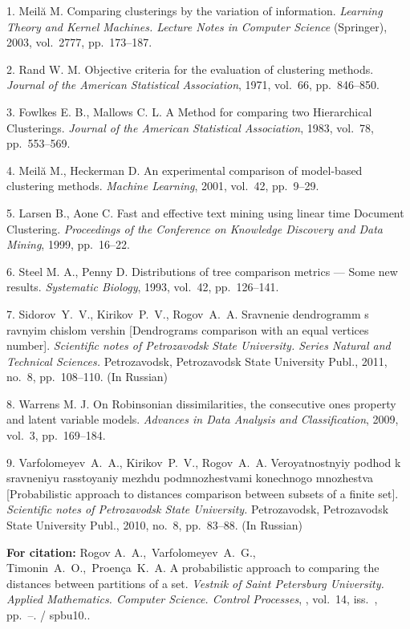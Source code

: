 

{\footnotesize

\vskip 2mm


\vskip 1.5mm

1. Meil\u{a} M. Comparing clusterings by the variation of
information. {\it Learning Theory and Kernel Machines. Lecture
Notes in Computer Science} (Springer), 2003, vol.~2777,
pp.~173--187.

2. Rand W. M. Objective criteria for the evaluation of clustering
methods. {\it Journal of the American Statistical Association},
1971, vol.~66, pp.~846--850.

3. Fowlkes E. B., Mallows C. L. A Method for comparing two
Hierarchical Clusterings. {\it Journal of the American Statistical
Association}, 1983, vol.~78, pp.~553--569.

4. Meil\u{a} M., Heckerman D. An experimental comparison of
model-based clustering methods. {\it Machine Learning}, 2001,
vol.~42, pp.~9--29.

5. Larsen B., Aone C. Fast and effective text mining using linear
time Document Clustering. {\it Proceedings of the Conference on
Knowledge Discovery and Data Mining}, 1999, pp.~16--22.

6. Steel M. A., Penny D. Distributions of tree comparison metrics
--- Some new results. {\it Systematic Biology}, 1993, vol.~42,
pp.~126--141.

7. Sidorov~Y.~V., Kirikov~P.~V., Rogov~A.~A. Sravnenie dendrogramm
s ravnyim chislom vershin [Dendrograms comparison with an equal
vertices number].  {\it Scientific notes of Petrozavodsk State
University. Series Natural and Technical Sciences.} Petrozavodsk,
Petrozavodsk State University Publ., 2011, no.~8, pp.~108--110.
(In Russian)

8. Warrens M. J. On Robinsonian dissimilarities, the consecutive
ones property and latent variable models. {\it Advances in Data
Analysis and Classification}, 2009, vol.~3, pp.~169--184.

9. Varfolomeyev~A.~A., Kirikov~P.~V., Rogov~A.~A. Veroyatnostnyiy
podhod k sravneniyu rasstoyaniy mezhdu podmnozhestvami konechnogo
mnozhestva [Probabilistic approach to distances comparison between
subsets of a finite set]. {\it Scientific notes of Petrozavodsk
State University.} Petrozavodsk, Petrozavodsk State University
Publ., 2010, no.~8, pp.~83--88. (In Russian)



\vskip 1.2mm

{\bf For citation:}  Rogov A.~A.,~Varfolomeyev~A.~G.,
Timonin~A.~O.,~Proen\c{c}a~K.~A. A probabilistic approach to
comparing the distances between partitions of a set. {\it Vestnik
of Saint Petersburg University. Applied Mathematics. Computer
Science. Control Processes}, \issueyear, vol.~14, iss.~\issuenum,
pp.~\pageref{p2}--\pageref{p2e}. \doivyp/
spbu10.\issueyear.



}
